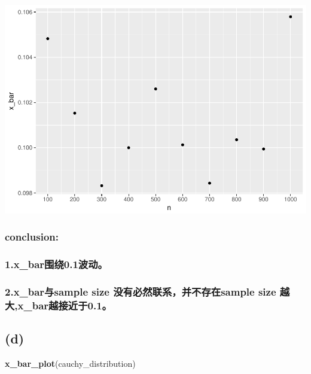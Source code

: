 \documentclass[]{article}
\newenvironment{Shaded}{\begin{snugshade}}{\end{snugshade}}
\newcommand{\KeywordTok}[1]{\textcolor[rgb]{0.13,0.29,0.53}{\textbf{{#1}}}}
\newcommand{\NormalTok}[1]{{#1}}
\begin{document}
\includegraphics{advEconometric_homework_files/figure-latex/unnamed-chunk-4-1.pdf}

\subsubsection{conclusion:}\label{conclusion-2}

\subsubsection{1.x\_bar围绕0.1波动。}\label{xux5fbar0.1}

\subsubsection{2.x\_bar与sample size 没有必然联系，并不存在sample size
越大,x\_bar越接近于0.1。}\label{xux5fbarsample-size-sample-size-xux5fbar0.1}

 \newpage

\subsection{(d)}\label{d}

\begin{Shaded}
\begin{Highlighting}[]
\KeywordTok{x_bar_plot}\NormalTok{(cauchy_distribution)}
\end{Highlighting}
\end{Shaded}
\end{document}
